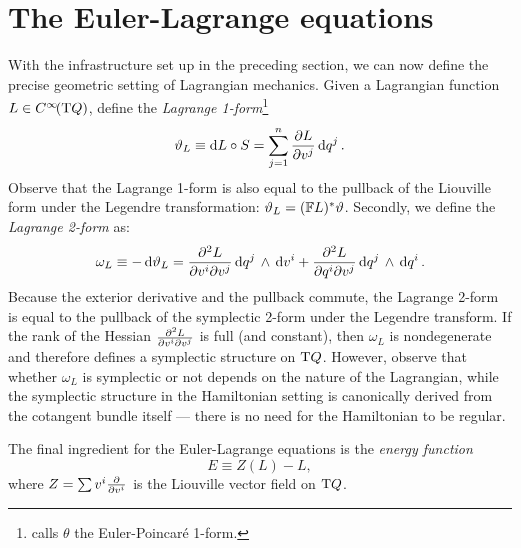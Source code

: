 \section{The Euler-Lagrange equations} With the infrastructure set up in the preceding section, we can now define the precise geometric setting of Lagrangian mechanics. Given a Lagrangian function $L \in C^\infty\!\qty(\mathrm{T}Q)$, define the \emph{Lagrange 1-form}\footnote
{\citet{Carinena1990} calls $\theta$ the Euler-Poincaré 1-form.}
\begin{equation}
    \vartheta_L \equiv \dd{L} \circ S = \sum_{j=1}^n \pdv{L}{v^j}\dd{q^j}.
\end{equation}
Observe that the Lagrange 1-form is also equal to the pullback of the Liouville form under the Legendre transformation: $\vartheta_L = (\mathbb{F}L)^* \vartheta$. \cite{Abraham1978}
Secondly, we define the \emph{Lagrange 2-form} as: \cite{Abraham1978,Carinena1990}
\begin{equation}
    \omega_L \equiv - \dd{\vartheta}_L = \pdv[2]{L}{v^i}{v^j} \dd{q^j}\,\wedge\,\dd{v^i}  + \pdv[2]{L}{q^i}{v^j} \dd{q^j}\,\wedge\,\dd{q^i} .
\end{equation}
Because the exterior derivative and the pullback commute, the Lagrange 2-form is equal to the pullback of the symplectic 2-form under the Legendre transform. If the rank of the Hessian $ \pdv[2]{L}{v^i}{v^j}$ is full (and constant), then $\omega_L$ is nondegenerate and therefore defines a symplectic structure on $\mathrm{T}Q$. However, observe that whether $\omega_L$ is symplectic or not depends on the nature of the Lagrangian, while the symplectic structure in the Hamiltonian setting is canonically derived from the cotangent bundle itself --- there is no need for the Hamiltonian to be regular.

The final ingredient for the Euler-Lagrange equations is the \emph{energy function}
$$ E \equiv Z(L) - L, $$
where $Z = \sum v^i \pdv{}{v^i}$ is the Liouville vector field on $\mathrm{T}Q$.

